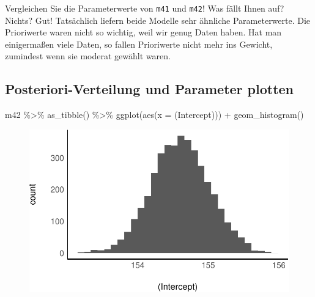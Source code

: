 \documentclass[
  a4paper,
  DIV=11]{scrreprt}
\newenvironment{Shaded}{\begin{snugshade}}{\end{snugshade}}
\newcommand{\AttributeTok}[1]{\textcolor[rgb]{0.40,0.45,0.13}{#1}}
\newcommand{\FunctionTok}[1]{\textcolor[rgb]{0.28,0.35,0.67}{#1}}
\newcommand{\NormalTok}[1]{\textcolor[rgb]{0.00,0.23,0.31}{#1}}
\newcommand{\SpecialCharTok}[1]{\textcolor[rgb]{0.37,0.37,0.37}{#1}}
\newcommand{\StringTok}[1]{\textcolor[rgb]{0.13,0.47,0.30}{#1}}
\theoremstyle{definition}
\theoremstyle{remark}
\begin{document}
\begin{tcolorbox}[enhanced jigsaw, colframe=quarto-callout-important-color-frame, title=\textcolor{quarto-callout-important-color}{\faExclamation}\hspace{0.5em}{Wichtig}, breakable, leftrule=.75mm, coltitle=black, toptitle=1mm, bottomrule=.15mm, bottomtitle=1mm, opacityback=0, arc=.35mm, rightrule=.15mm, left=2mm, colbacktitle=quarto-callout-important-color!10!white, opacitybacktitle=0.6, toprule=.15mm, titlerule=0mm, colback=white]
Vergleichen Sie die Parameterwerte von \texttt{m41} und \texttt{m42}!
Was fällt Ihnen auf? Nichts? Gut! Tatsächlich liefern beide Modelle sehr
ähnliche Parameterwerte. Die Prioriwerte waren nicht so wichtig, weil
wir genug Daten haben. Hat man einigermaßen viele Daten, so fallen
Prioriwerte nicht mehr ins Gewicht, zumindest wenn sie moderat gewählt
waren.
\end{tcolorbox}

\hypertarget{posteriori-verteilung-und-parameter-plotten}{%
\subsection{Posteriori-Verteilung und Parameter
plotten}\label{posteriori-verteilung-und-parameter-plotten}}

\begin{Shaded}
\begin{Highlighting}[]
\NormalTok{m42 }\SpecialCharTok{\%\textgreater{}\%} 
  \FunctionTok{as\_tibble}\NormalTok{() }\SpecialCharTok{\%\textgreater{}\%} 
  \FunctionTok{ggplot}\NormalTok{(}\FunctionTok{aes}\NormalTok{(}\AttributeTok{x =} \StringTok{\textasciigrave{}}\AttributeTok{(Intercept)}\StringTok{\textasciigrave{}}\NormalTok{)) }\SpecialCharTok{+}
  \FunctionTok{geom\_histogram}\NormalTok{()}
\end{Highlighting}
\end{Shaded}

\begin{figure}[H]

{\centering \includegraphics{./gauss_files/figure-pdf/unnamed-chunk-7-1.pdf}

}

\end{figure}
\end{document}
